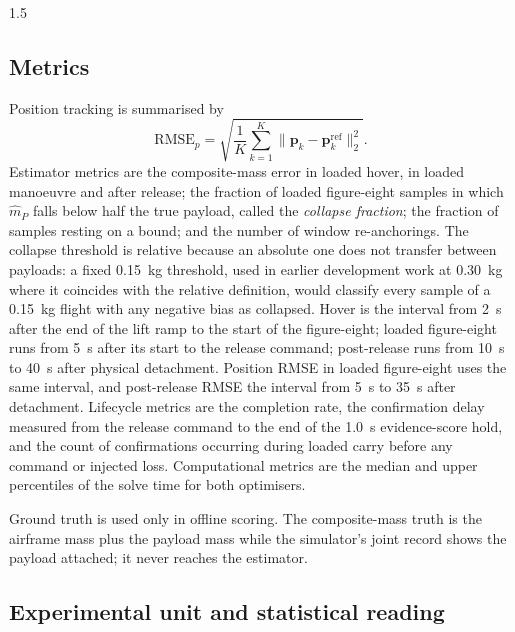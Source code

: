 \begin{spacing}{1.5}
\subsection{Metrics}\label{sec:eval:metrics}

Position tracking is summarised by
\begin{equation}
\mathrm{RMSE}_p = \sqrt{\frac{1}{K}\sum_{k=1}^{K}\bigl\lVert\bm p_k - \bm p^{\mathrm{ref}}_k\bigr\rVert_2^2}.
\label{eq:rmse}
\end{equation}
Estimator metrics are the composite-mass error in loaded hover, in loaded
manoeuvre and after release; the fraction of loaded figure-eight samples in which
$\hat m_P$ falls below half the true payload, called the \emph{collapse
fraction}; the fraction of samples resting on a bound; and the number of window
re-anchorings. The collapse threshold is relative because an absolute one does
not transfer between payloads: a fixed \SI{0.15}{\kg} threshold, used in
earlier development work at \SI{0.30}{\kg} where it coincides with the relative
definition, would classify every sample of a \SI{0.15}{\kg} flight with any
negative bias as collapsed. Hover is the interval from \SI{2}{\second} after
the end of the lift ramp to the start of the figure-eight; loaded figure-eight
runs from \SI{5}{\second} after its start to the release command; post-release
runs from \SI{10}{\second} to \SI{40}{\second} after physical detachment.
Position RMSE in loaded figure-eight uses the same interval, and post-release
RMSE the interval from \SI{5}{\second} to \SI{35}{\second} after detachment.
Lifecycle metrics are the completion rate, the confirmation delay measured from
the release command to the end of the \SI{1.0}{\second} evidence-score hold, and the
count of confirmations occurring during loaded carry before any command or
injected loss. Computational metrics are the median and upper percentiles of the
solve time for both optimisers.

Ground truth is used only in offline scoring. The composite-mass truth is the
airframe mass plus the payload mass while the simulator's joint record shows the
payload attached; it never reaches the estimator.

\subsection{Experimental unit and statistical reading}\label{sec:eval:stats}


\end{spacing}

